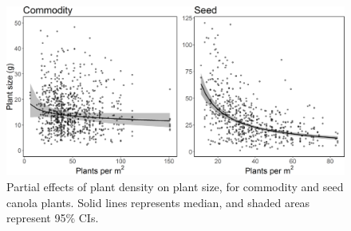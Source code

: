 \documentclass[12pt, draft]{article} %
\begin{document}

\begin{figure} 
    \centering
    \includegraphics[width=\textwidth,keepaspectratio=true]{plDensPlSize_both.png}
    \caption[Partial effects of plant density on plant size]{Partial effects of plant density on plant size, for commodity and seed canola plants. Solid lines represents median, and shaded areas represent 95\% CIs.}
    \label{fig:plDensPlSize}
\end{figure}
\end{document}
